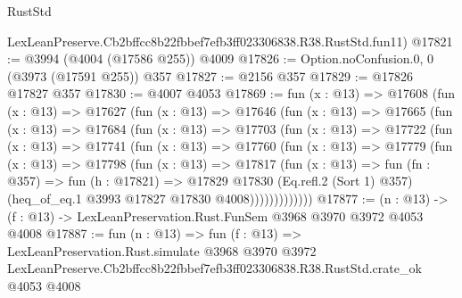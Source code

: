 \begin{lexlean}{RustStd}
\begin{coremodule}
    LexLeanPreserve.Cb2bffcc8b22fbbef7efb3ff023306838.R38.RustStd.fun11)
@17821 := @3994 (@4004 (@17586 @255)) @4009
@17826 := Option.noConfusion.{0, 0} (@3973 (@17591 @255)) @357
@17827 := @2156 @357
@17829 := @17826 @17827 @357
@17830 := @4007 @4053
@17869 := fun (x : @13) =>
  @17608
    (fun (x : @13) =>
    @17627
      (fun (x : @13) =>
      @17646
        (fun (x : @13) =>
        @17665
          (fun (x : @13) =>
          @17684
            (fun (x : @13) =>
            @17703
              (fun (x : @13) =>
              @17722
                (fun (x : @13) =>
                @17741
                  (fun (x : @13) =>
                  @17760
                    (fun (x : @13) =>
                    @17779
                      (fun (x : @13) =>
                      @17798
                        (fun (x : @13) =>
                        @17817
                          (fun (x : @13) =>
                          fun (fn : @357) =>
                          fun (h : @17821) =>
                          @17829
                            @17830
                            (Eq.refl.{2} (Sort 1) @357)
                            (heq_of_eq.{1} @3993 @17827 @17830 @4008)))))))))))))
@17877 := (n : @13) -> (f : @13) -> LexLeanPreservation.Rust.FunSem @3968 @3970 @3972 @4053 @4008
@17887 := fun (n : @13) =>
  fun (f : @13) =>
  LexLeanPreservation.Rust.simulate
    @3968
    @3970
    @3972
    LexLeanPreserve.Cb2bffcc8b22fbbef7efb3ff023306838.R38.RustStd.crate_ok
    @4053
    @4008
\end{coremodule}
\end{lexlean}
